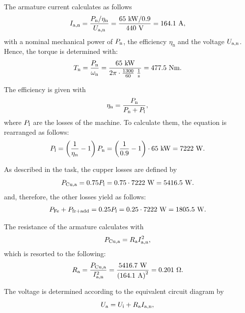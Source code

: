 \begin{solutionblock}
	The armature current calculates as follows
	\begin{equation}
		I_{\mathrm{a,n}} = \frac{\Pn / \eta_{\mathrm{n}}}{\Uan}
		= \frac{65 \ \si{kW} / 0.9}{440 \ \si{V}}
		= 164.1 \ \si{A},
	\end{equation}
	with a nominal mechanical power of $\Pn$, the efficiency $\eta_{\mathrm{n}}$ and the voltage $\Uan$.
	Hence, the torque is determined with:
	\begin{equation}
		\Tn = \frac{\Pn}{\omega_{\mathrm{n}}}
		= \frac{65 \ \si{kW}}{2 \pi \cdot \frac{1300}{60} \ \si{\frac{1}{s}}}
		= 477.5 \ \si{Nm}.
	\end{equation}

	The efficiency is given with
	\begin{equation}
		\eta_{\mathrm{n}} = \frac{\Pn}{\Pn + \Pl},
	\end{equation}
	where $\Pl$ are the losses of the machine. To calculate them, the equation is rearranged as follows:
	\begin{equation}
		\Pl = \left(\frac{1}{\eta_{n}} - 1 \right) \Pn
		= \left(\frac{1}{0.9}-1 \right) \cdot 65\ \si{kW}
		= 7222 \ \si{W}.
	\end{equation}

	As described in the task, the cupper losses are defined by
	\begin{equation}
		P_{\mathrm{Cu,a}} = 0.75 \Pl
		= 0.75 \cdot 7222 \ \si{W}
		= 5416.5 \ \si{W}.
	\end{equation}
	and, therefore, the other losses yield as follows:
	\begin{equation}
		P_{\mathrm{Fe}} + P_{\mathrm{fr + add}} = 0.25 \Pl
		= 0.25 \cdot 7222 \ \si{W}
		= 1805.5 \ \si{W}.
	\end{equation}

	The resistance of the armature calculates with
	\begin{equation}
		P_{\mathrm{Cu,a}} = \Ra I_{\mathrm{a,n}}^{2},
	\end{equation}
	which is resorted to the following:
	\begin{equation}
		\Ra = \frac{P_{\mathrm{Cu,a}}}{I_{\mathrm{a,n}}^{2}}
		= \frac{5416.7 \ \si{W}}{\left(164.1 \ \si{A}\right)^2}
		= 0.201 \ \si{\Omega}.
	\end{equation}

	The voltage is determined according to the equivalent circuit diagram by
	\begin{equation}
		\Ua = \Ui + \Ra I_{\mathrm{a,n}},
	\end{equation}


\end{solutionblock}
